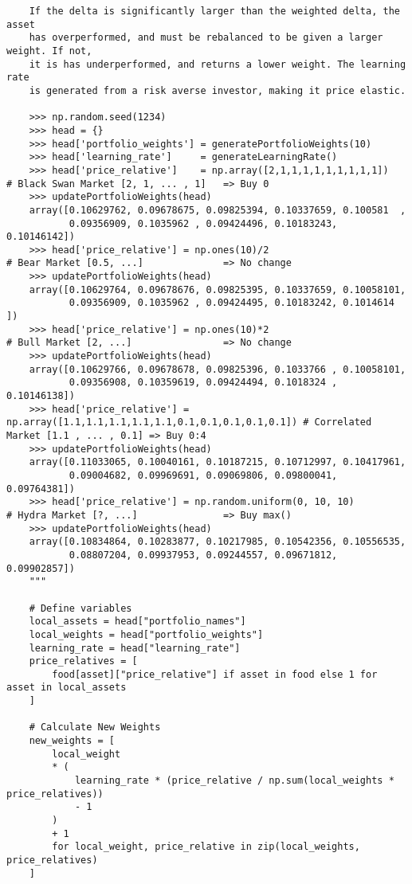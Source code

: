 \documentclass[11pt, a4paper]{awesome-cv}
\begin{document}
\begin{cvletter}
\begin{verbatim}
    If the delta is significantly larger than the weighted delta, the asset
    has overperformed, and must be rebalanced to be given a larger weight. If not,
    it is has underperformed, and returns a lower weight. The learning rate
    is generated from a risk averse investor, making it price elastic.

    >>> np.random.seed(1234)
    >>> head = {}
    >>> head['portfolio_weights'] = generatePortfolioWeights(10)
    >>> head['learning_rate']     = generateLearningRate()
    >>> head['price_relative']    = np.array([2,1,1,1,1,1,1,1,1,1])                  # Black Swan Market [2, 1, ... , 1]   => Buy 0
    >>> updatePortfolioWeights(head)
    array([0.10629762, 0.09678675, 0.09825394, 0.10337659, 0.100581  ,
           0.09356909, 0.1035962 , 0.09424496, 0.10183243, 0.10146142])
    >>> head['price_relative'] = np.ones(10)/2                                       # Bear Market [0.5, ...]              => No change
    >>> updatePortfolioWeights(head)
    array([0.10629764, 0.09678676, 0.09825395, 0.10337659, 0.10058101,
           0.09356909, 0.1035962 , 0.09424495, 0.10183242, 0.1014614 ])
    >>> head['price_relative'] = np.ones(10)*2                                       # Bull Market [2, ...]                => No change
    >>> updatePortfolioWeights(head)
    array([0.10629766, 0.09678678, 0.09825396, 0.1033766 , 0.10058101,
           0.09356908, 0.10359619, 0.09424494, 0.1018324 , 0.10146138])
    >>> head['price_relative'] = np.array([1.1,1.1,1.1,1.1,1.1,0.1,0.1,0.1,0.1,0.1]) # Correlated Market [1.1 , ... , 0.1] => Buy 0:4
    >>> updatePortfolioWeights(head)
    array([0.11033065, 0.10040161, 0.10187215, 0.10712997, 0.10417961,
           0.09004682, 0.09969691, 0.09069806, 0.09800041, 0.09764381])
    >>> head['price_relative'] = np.random.uniform(0, 10, 10)                        # Hydra Market [?, ...]               => Buy max()
    >>> updatePortfolioWeights(head)
    array([0.10834864, 0.10283877, 0.10217985, 0.10542356, 0.10556535,
           0.08807204, 0.09937953, 0.09244557, 0.09671812, 0.09902857])
    """

    # Define variables
    local_assets = head["portfolio_names"]
    local_weights = head["portfolio_weights"]
    learning_rate = head["learning_rate"]
    price_relatives = [
        food[asset]["price_relative"] if asset in food else 1 for asset in local_assets
    ]

    # Calculate New Weights
    new_weights = [
        local_weight
        * (
            learning_rate * (price_relative / np.sum(local_weights * price_relatives))
            - 1
        )
        + 1
        for local_weight, price_relative in zip(local_weights, price_relatives)
    ]


\end{verbatim}
\end{cvletter}
\end{document}
